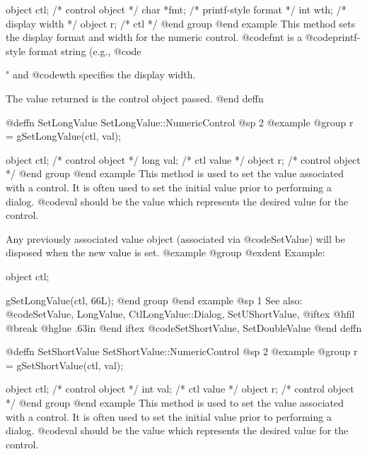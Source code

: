 object  ctl;    /*  control object          */
char    *fmt;   /*  printf-style format     */
int     wth;    /*  display width           */
object  r;      /*  ctl                     */
@end group
@end example
This method sets the display format and width for the numeric control.
@code{fmt} is a @code{printf}-style format string (e.g., @code{"%
and @code{wth} specifies the display width.

The value returned is the control object passed.
@end deffn















@deffn {SetLongValue} SetLongValue::NumericControl
@sp 2
@example
@group
r = gSetLongValue(ctl, val);

object  ctl;    /*  control object  */
long    val;    /*  ctl value       */
object  r;      /*  control object  */
@end group
@end example
This method is used to set the value associated with a control.  It is
often used to set the initial value prior to performing a dialog.
@code{val} should be the value which represents the desired value for
the control.

Any previously associated value object (associated via @code{SetValue})
will be disposed when the new value is set.
@example
@group
@exdent Example:

object  ctl;

gSetLongValue(ctl, 66L);
@end group
@end example
@sp 1
See also:  @code{SetValue, LongValue, CtlLongValue::Dialog, SetUShortValue,}
@iftex
@hfil @break @hglue .63in 
@end iftex
@code{SetShortValue, SetDoubleValue}
@end deffn














@deffn {SetShortValue} SetShortValue::NumericControl
@sp 2
@example
@group
r = gSetShortValue(ctl, val);

object  ctl;    /*  control object  */
int     val;    /*  ctl value       */
object  r;      /*  control object  */
@end group
@end example
This method is used to set the value associated with a control.  It is
often used to set the initial value prior to performing a dialog.
@code{val} should be the value which represents the desired value for
the control.

}
